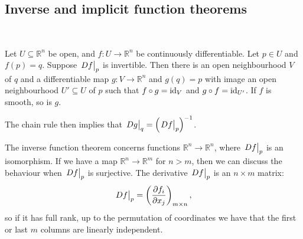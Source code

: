 \documentclass[a4paper]{article}
\begin{document}
\subsection{Inverse and implicit function theorems}
\ \vspace*{-1.5em}

\begin{theorem}
	Let \( U \subseteq \mathbb R^n \) be open, and \( f \colon U \to \mathbb R^n \) be continuously differentiable.
	Let \( p \in U \) and \( f(p) = q \).
	Suppose \( \eval{Df}_p \) is invertible.
	Then there is an open neighbourhood \( V \) of \( q \) and a differentiable map \( g \colon V \to \mathbb R^n \) and \( g(q) = p \) with image an open neighbourhood \( U' \subseteq U \) of \( p \) such that \( f \circ g = \operatorname{id}_V \) and $ g\circ f = \operatorname{id}_{U'} $.
	If \( f \) is smooth, so is $g$.
\end{theorem}
\begin{remark}
	The chain rule then implies that \( \eval{Dg}_q = \qty(\eval{Df}_p)^{-1} \).
\end{remark}

The inverse function theorem concerns functions \( \mathbb R^n \to \mathbb R^n \), where \( \eval{Df}_p \) is an isomorphism.
If we have a map \( \mathbb R^n \to \mathbb R^m \) for \( n > m \), then we can discuss the behaviour when \( \eval{Df}_p \) is surjective.
The derivative \( \eval{Df}_p \) is an \( n \times m \) matrix:
\[
	{\textstyle\eval{Df}_p} = \left( \pdv{f_i}{x_j} \right)_{m\times n},
\]
so if it has full rank, up to the permutation of coordinates we have that the first or last \( m \) columns are linearly independent.
\end{document}
